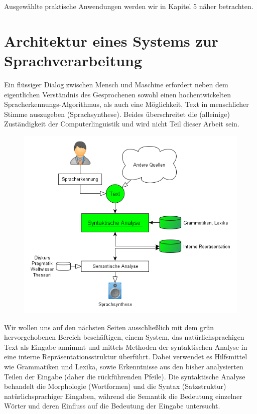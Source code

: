 \documentclass[12pt,a4paper]{article}
\theoremstyle{definition}
\begin{document}
		Ausgewählte praktische Anwendungen werden wir in Kapitel 5 näher betrachten.

\pagebreak
\section{Architektur eines Systems zur Sprachverarbeitung}
	Ein flüssiger Dialog zwischen Mensch und Maschine erfordert neben dem eigentlichen Verständnis des Gesprochenen sowohl einen hochentwickelten Spracherkennungs-Algorithmus, als auch eine Möglichkeit, Text in menschlicher Stimme auszugeben (Sprachsynthese). Beides überschreitet die (alleinige) Zuständigkeit der Computerlinguistik und wird nicht Teil dieser Arbeit sein.
	
	\begin{figure}[hbtp]
	\centering
	\label{Architektur eines natürlichsprachigen Systems}
	\includegraphics[width=\linewidth]{Grafiken/Architektur}
	\end{figure}
	
	Wir wollen uns auf den nächsten Seiten ausschließlich mit dem grün hervorgehobenen Bereich beschäftigen, einem System, das natürlichsprachigen Text als Eingabe annimmt und mittels Methoden der syntaktischen Analyse in eine interne Repräsentationsstruktur überführt.  Dabei verwendet es Hilfsmittel wie Grammatiken und Lexika, sowie Erkenntnisse aus den bisher analysierten Teilen der Eingabe (daher die rückführenden Pfeile).
	Die syntaktische Analyse behandelt die Morphologie (Wortformen) und die Syntax (Satzstruktur) natürlichsprachiger Eingaben, während die Semantik die Bedeutung einzelner Wörter und deren Einfluss auf die Bedeutung der Eingabe untersucht.
\end{document}
